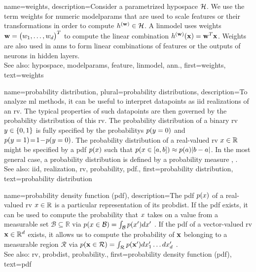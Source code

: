 {name={weights},
 description={Consider a parametrized \gls{hypospace} $\mathcal{H}$. We use the term 
 	weights for numeric \gls{modelparams} that are used to scale \glspl{feature} or their transformations 
 	in order to compute $h^{({\bf w})} \in \mathcal{H}$. A \gls{linmodel} uses weights ${\bf w}=\big(w_{1},\ldots,w_{d}\big)^{T}$ to compute the linear combination 
 	$h^{({\bf w})}({\bf x})= {\bf w}^{T} {\bf x}$. Weights are also used in \glspl{ann} 
 	to form linear combinations of \glspl{feature} or the outputs of neurons in hidden layers.
				\\
		See also: \gls{hypospace}, \gls{modelparams}, \gls{feature}, \gls{linmodel}, \gls{ann}.},
	first={weights},
	text={weights}
}
	
{name={probability distribution}, 
 plural={probability distributions},
 description={To analyze \gls{ml} methods, it can be useful 
		to interpret \glspl{datapoint} as \gls{iid} \glspl{realization} of an \gls{rv}. The typical 
		properties of such \glspl{datapoint} are then governed by the \gls{probability} distribution 
		of this \gls{rv}. The \gls{probability} distribution of a binary \gls{rv} $y \in \{0,1\}$ 
		is fully specified by the \glspl{probability} $p({y = 0})$ and 
		$p({y=1})\!=\!1\!-\!p({y=0})$. The \gls{probability} 
		distribution of a real-valued \gls{rv} $x \in \mathbb{R}$ might be specified 
		by a \gls{pdf} $p(x)$ such that $p({ x \in [a,b] }) \approx  p(a) |b-a|$. 
	    In the most general case, a \gls{probability} distribution is defined by a \gls{probability} measure \cite{BillingsleyProbMeasure}, \cite{GrayProbBook}.
	    		\\
		See also: \gls{iid}, \gls{realization}, \gls{rv}, \gls{probability}, \gls{pdf}.},
	first={probability distribution},
	text={probability distribution}}
    
    
{name={probability density function (pdf)},
 description={The pdf $p(x)$ of a real-valued \gls{rv} 
 	$x \in \mathbb{R}$ is a particular representation of its \gls{probdist}. If the pdf exists, it can 
 	be used to compute the \gls{probability} that $x$ takes on a value from a measurable set 
 	$\mathcal{B} \subseteq \mathbb{R}$ via $p({x \in \mathcal{B}}) = \int_{\mathcal{B}} p(x') d x'$ \cite[Ch. 3]{BertsekasProb}. 
	If the pdf of a vector-valued \gls{rv} ${\bf x} \in \mathbb{R}^{d}$ exists, it 
     allows us to compute the \gls{probability} of ${\bf x}$ belonging to a measurable region $\mathcal{R}$ via 
        $p({{\bf x} \in \mathcal{R}}) = \int_{\mathcal{R}} p({\bf x}') d x_{1}' \ldots d x_{d}' $ \cite[Ch. 3]{BertsekasProb}.
        		\\
		See also: \gls{rv}, \gls{probdist}, \gls{probability}.},
first={probability density function (pdf)},
text={pdf}
}


